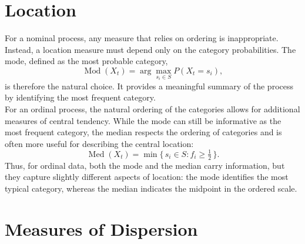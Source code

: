 ﻿\documentclass[12pt,a4paper]{scrreprt}
\theoremstyle{definition}
\begin{document}
\section{Location}

For a nominal process, any measure that relies on ordering is inappropriate.
Instead, a location measure must depend only on the category probabilities.
The mode, defined as the most probable category,
\[
\operatorname{Mod}(X_t) = \arg\max_{s_i \in S} P(X_t = s_i),
\]
is therefore the natural choice. It provides a meaningful summary of the process by identifying the most frequent category.\\
For an ordinal process, the natural ordering of the categories allows for additional measures of central tendency.
While the mode can still be informative as the most frequent category, the median respects the ordering of categories and is often more useful for describing the central location:
\[
\operatorname{Med}(X_t)
=
\min \bigl\{\, s_i \in S : f_i \ge \tfrac{1}{2} \,\bigr\}.
\]
Thus, for ordinal data, both the mode and the median carry information, but they capture slightly different aspects of location: the mode identifies the most typical category, whereas the median indicates the midpoint in the ordered scale.
\section{Measures of Dispersion}
\end{document}
